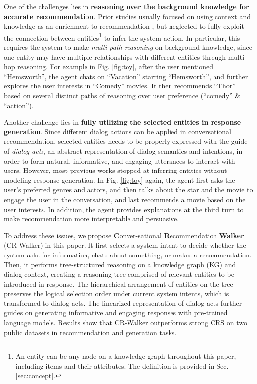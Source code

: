 \documentclass[11pt]{article}
\begin{document}
One of the challenges lies in \textbf{reasoning over the background knowledge for accurate recommendation}. Prior studies usually focused on using context and knowledge as an enrichment to recommendation \cite{chen2019towards,zhou2020improving}, but neglected to fully exploit the connection between entities\footnote{An entity can be any node on a knowledge graph throughout this paper, including items and their attributes. The definition is provided in Sec. \ref{sec:concept}.} to infer the system action. In particular, this requires the system to make \textit{multi-path reasoning} on background knowledge, since one entity may have multiple relationships with different entities through multi-hop reasoning. For example in Fig. \ref{fig:toy}, after the user mentioned ``Hemsworth'', the agent chats on ``Vacation'' starring ``Hemsworth'', and further explores the user interests in ``Comedy'' movies. It then recommends ``Thor'' based on several distinct paths of reasoning over user preference (``comedy'' \& ``action'').


Another challenge lies in \textbf{fully utilizing the selected entities in response generation}. Since different dialog actions can be applied in conversational recommendation, selected entities needs to be properly expressed with the guide of \textit{dialog acts}, an abstract representation of dialog semantics and intentions, in order to form natural, informative, and engaging utterances to interact with users. However, most previous works \cite{moon2019opendialkg,lei2020estimation} stopped at inferring entities without modeling response generation. In Fig. \ref{fig:toy} again, the agent first asks the user's preferred genres and actors, and then talks about the star and the movie to engage the user in the conversation, and last recommends a movie based on the user interests. In addition, the agent provides explanations at the third turn to make recommendation more interpretable and persuasive.


To address these issues, we propose \textbf{C}onver-sational \textbf{R}ecommendation \textbf{Walker} (CR-Walker) in this paper. It first selects a system intent to decide whether the system asks for information, chats about something, or makes a recommendation. Then, it performs tree-structured reasoning on a knowledge graph (KG) and dialog context, creating a reasoning tree comprised of relevant entities to be introduced in response. The hierarchical arrangement of entities on the tree preserves the logical selection order under current system intents, which is transformed to dialog acts. The linearized representation of dialog acts further guides on generating informative and engaging responses with pre-trained language models.
Results show that CR-Walker outperforms strong CRS on two public datasets in recommendation and generation tasks.
\end{document}
